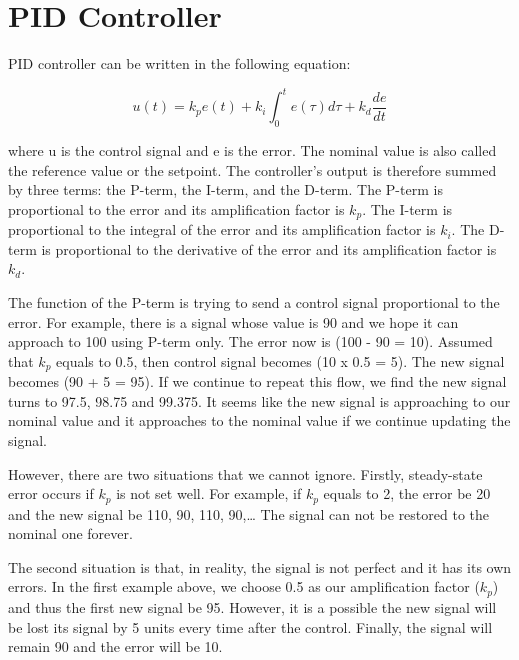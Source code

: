 \section{PID Controller} %
PID controller can be written in the following equation:

\begin{equation} \label{eq3}
u(t) = k_p e(t) + k_i \int_{0}^{t} e(\tau) d\tau + k_d \frac{d e}{d t}
\end{equation}

 where u is the control signal and e is the error. The nominal value is also called the reference value or the setpoint. The controller’s output is therefore summed by three terms: the P-term, the I-term, and the D-term. The P-term is proportional to the error and its amplification factor is $k_p$. The I-term is proportional to the integral of the error and its amplification factor is $k_i$. The D-term is proportional to the derivative of the error and its amplification factor is $k_d$. 
 
 The function of the P-term is trying to send a control signal proportional to the error. For example, there is a signal whose value is 90 and we hope it can approach to 100 using P-term only. The error now is (100 - 90 = 10). Assumed that $k_p$ equals to 0.5, then control signal becomes (10 x 0.5 = 5). The new signal becomes (90 + 5 = 95). If we continue to repeat this flow, we find the new signal turns to 97.5, 98.75 and 99.375. It seems like the new signal is approaching to our nominal value and it approaches to the nominal value if we continue updating the signal. 
 

However, there are two situations that we cannot ignore. Firstly, steady-state error occurs if $k_p$ is not set well. For example, if $k_p$ equals to 2, the error be 20 and the new signal be 110, 90, 110, 90,… The signal can not be restored to the nominal one forever.  

The second situation is that, in reality, the signal is not perfect and it has its own errors. In the first example above, we choose 0.5 as our amplification factor ($k_p$) and thus the first new signal be 95. However, it is a possible the new signal will be lost its signal by 5 units every time after the control. Finally, the signal will remain 90 and the error will be 10.  

